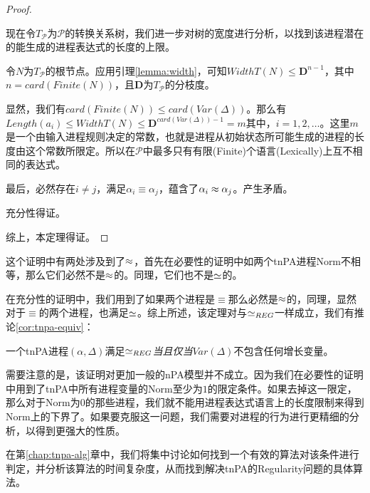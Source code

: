 \begin{proof}
\begin{itemize}
现在令$T_{\mathcal{P}}$为$\mathcal{P}$的转换关系树，我们进一步对树的宽度进行分析，以找到该进程潜在的能生成的进程表达式的长度的上限。

令$N$为$T_{\mathcal{P}}$的根节点。应用引理\ref{lemma:width}，可知$WidthT(N)\leq \mathbf{D}^{n-1}$，其中$n=card(Finite(N))$，且$\mathbf{D}$为$T_{\mathcal{P}}$的分枝度。

显然，我们有$card(Finite(N))\leq card(Var(\Delta))$。那么有$Length(a_i)\leq WidthT(N)\leq \mathbf{D}^{card(Var(\Delta))-1}=m$其中，$i=1,2,\ldots$。这里$m$是一个由输入进程规则决定的常数，也就是进程从初始状态所可能生成的进程的长度由这个常数所限定。所以在$\mathcal{P}$中最多只有有限(Finite)个语言(Lexically)上互不相同的表达式。

最后，必然存在$i\neq j$，满足$\alpha_i\equiv \alpha_j$，蕴含了$\alpha_i\approx \alpha_j$。产生矛盾。

充分性得证。
\end{itemize}
综上，本定理得证。
\end{proof}

这个证明中有两处涉及到了$\approx$，首先在必要性的证明中如两个tnPA进程Norm不相等，那么它们必然不是$\approx$的。同理，它们也不是$\simeq$的。

在充分性的证明中，我们用到了如果两个进程是$\equiv$那么必然是$\approx$的，同理，显然对于$\equiv$的两个进程，也满足$\simeq$。综上所述，该定理对与$\simeq_{REG}$一样成立，我们有推论\ref{cor:tnpa-equiv}：

\begin{cor}\label{cor:tnpa-equiv}
一个tnPA进程$(\alpha,\Delta)$满足$\simeq_{REG}$\emph{当且仅当}$Var(\Delta)$不包含任何增长变量。
\end{cor}

需要注意的是，该证明对更加一般的nPA模型并不成立。因为我们在必要性的证明中用到了tnPA中所有进程变量的Norm至少为$1$的限定条件。如果去掉这一限定，那么对于Norm为$0$的那些进程，我们就不能用进程表达式语言上的长度限制来得到Norm上的下界了。如果要克服这一问题，我们需要对进程的行为进行更精细的分析，以得到更强大的性质。

在第\ref{chap:tnpa-alg}章中，我们将集中讨论如何找到一个有效的算法对该条件进行判定，并分析该算法的时间复杂度，从而找到解决tnPA的Regularity问题的具体算法。
